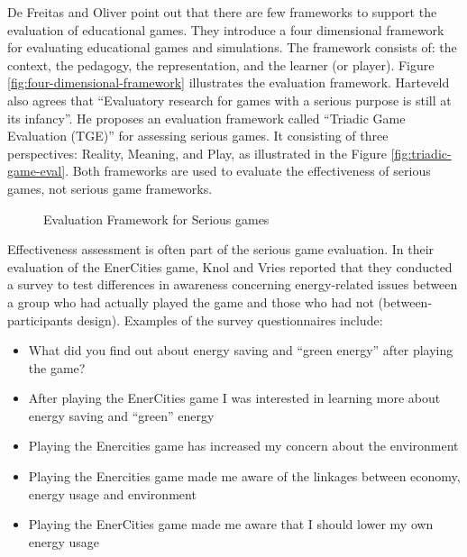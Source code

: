 De Freitas and Oliver \cite{de2006can} point out that there are few frameworks to support the evaluation of educational games. They introduce a four dimensional framework for evaluating 
educational games and simulations. The framework consists of: the context, the pedagogy, the representation, and the learner (or player). Figure \autoref{fig:four-dimensional-framework} illustrates the evaluation framework. Harteveld \cite{harteveld2010triadic} also agrees that ``Evaluatory research for games with a serious purpose is still at its infancy''. He proposes an evaluation framework called ``Triadic Game Evaluation (TGE)'' for assessing serious games. It consisting of three perspectives: Reality,
Meaning, and Play, as illustrated in the Figure \autoref{fig:triadic-game-eval}. Both frameworks are used to evaluate the effectiveness of serious games, not serious game frameworks.

\begin{figure}[ht!]
	\centering
		\caption{Evaluation Framework for Serious games}
\end{figure}

Effectiveness assessment is often part of the serious game evaluation. In their evaluation of the EnerCities game, Knol and Vries reported that they conducted a survey to test differences in awareness concerning energy-related issues between a group who had actually played the game and those who had not (between-participants design). Examples of the survey questionnaires include:
\begin{itemize}
\item What did you find out about energy saving and ``green energy'' after playing the game?
\item After playing the EnerCities game I was interested in learning more about energy saving and ``green'' energy
\item Playing the Enercities game has increased my concern about the environment
\item Playing the Enercities game made me aware of the linkages between economy, energy usage and environment
\item Playing the EnerCities game made me aware that I should lower my own energy usage
\end{itemize}

